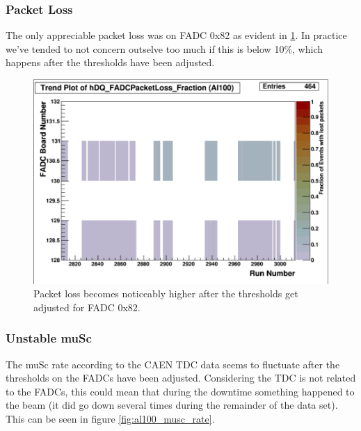 \documentclass[a4paper]{article}
\begin{document}
\subsubsection{Packet Loss}
\label{sec:al100_packet_loss}

The only appreciable packet loss was on FADC 0x82 as evident in \ref{fig:al100_packet_loss}.
In practice we've tended to not concern outselve too much if this is below 10\%, which
happens after the thresholds have been adjusted.

\begin{figure}
  \includegraphics[width=0.9\linewidth]{figs/al100/packet_loss}
  \caption{Packet loss becomes noticeably higher after the thresholds get adjusted for
    FADC 0x82.}
  \label{fig:al100_packet_loss}
\end{figure}


\subsubsection{Unstable muSc}

The muSc rate according to the CAEN TDC data seems to fluctuate after the thresholds
on the FADCs have been adjusted. Considering the TDC is not related to the FADCs,
this could mean that during the downtime something happened to the beam (it did go down
several times during the remainder of the data set). This can be seen in figure \ref{fig:al100_musc_rate}.
\end{document}
